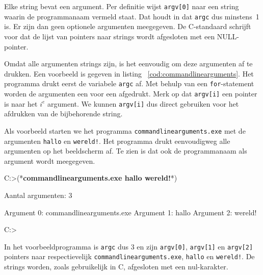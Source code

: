 Elke string bevat een argument. Per definitie wijst \texttt{argv[0]} naar een string waarin de programmanaam vermeld staat. Dat houdt in dat \texttt{argc} dus minstens~1 is. Er zijn dan geen optionele argumenten meegegeven. De C-standaard schrijft voor dat de lijst van pointers naar strings wordt afgesloten met een NULL-pointer.

Omdat alle argumenten strings zijn, is het eenvoudig om deze argumenten af te drukken. Een voorbeeld is gegeven in listing ~\ref{cod:commandlinearguments}. Het programma drukt eerst de variabele \texttt{argc} af. Met behulp van een \texttt{for}-statement worden de argumenten een voor een afgedrukt. Merk op dat \texttt{argv[i]} een pointer is naar het $i^e$ argument. We kunnen \texttt{argv[i]} dus direct gebruiken voor het afdrukken van de bijbehorende string.



Als voorbeeld starten we het programma \texttt{commandlinearguments.exe} met de argumenten \texttt{hallo} en \texttt{wereld!}. Het programma drukt eenvoudigweg alle argumenten op het beeldscherm af. Te zien is dat ook de programmanaam als argument wordt meegegeven.

\begin{dosbox}[title=Afdrukken van programmanaam en argumenten.,label=fig:poiargcv]
C:\Users\Cbook>(*\textbf{commandlinearguments.exe hallo wereld!}*)

Aantal argumenten: 3

Argument 0: commandlinearguments.exe
Argument 1: hallo
Argument 2: wereld!

C:\Users\Cbook>
\end{dosbox}

In het voorbeeldprogramma is \texttt{argc} dus 3 en zijn \texttt{argv[0]}, \texttt{argv[1]} en \texttt{argv[2]} pointers naar respectievelijk \texttt{commandlinearguments.exe}, \texttt{hallo} en \texttt{wereld!}. De strings worden, zoals gebruikelijk in C,  afgesloten met een nul-karakter.


